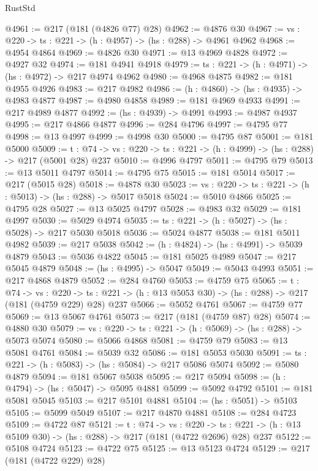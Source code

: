 \begin{lexlean}{RustStd}
\begin{coremodule}
@4961 := @217 (@181 (@4826 @77) @28)
@4962 := @4876 @30
@4967 := {vs : @220} -> {ts : @221} -> (h : @4957) -> (hs : @288) -> @4961 @4962
@4968 := @4954 @4864
@4969 := @4826 @30
@4971 := @13 @4969 @4828
@4972 := @4927 @32
@4974 := @181 @4941 @4918
@4979 := {ts : @221} -> (h : @4971) -> (hs : @4972) -> @217 @4974 @4962
@4980 := @4968 @4875
@4982 := @181 @4955 @4926
@4983 := @217 @4982
@4986 := (h : @4860) -> (hs : @4935) -> @4983 @4877
@4987 := @4980 @4858
@4989 := @181 @4969 @4933
@4991 := @217 @4989 @4877
@4992 := (hs : @4939) -> @4991
@4993 := @4987 @4937
@4995 := @217 @4866 @4877
@4996 := @284 @4796
@4997 := @4795 @77
@4998 := @13 @4997
@4999 := @4998 @30
@5000 := @4795 @87
@5001 := @181 @5000
@5009 := {t : @74} ->
  {vs : @220} -> {ts : @221} -> (h : @4999) -> (hs : @288) -> @217 (@5001 @28) @237
@5010 := @4996 @4797
@5011 := @4795 @79
@5013 := @13 @5011 @4797
@5014 := @4795 @75
@5015 := @181 @5014
@5017 := @217 (@5015 @28)
@5018 := @4878 @30
@5023 := {vs : @220} -> {ts : @221} -> (h : @5013) -> (hs : @288) -> @5017 @5018
@5024 := @5010 @4866
@5025 := @4795 @28
@5027 := @13 @5025 @4797
@5028 := @4983 @32
@5029 := @181 @4997
@5030 := @5029 @4974
@5035 := {ts : @221} -> (h : @5027) -> (hs : @5028) -> @217 @5030 @5018
@5036 := @5024 @4877
@5038 := @181 @5011 @4982
@5039 := @217 @5038
@5042 := (h : @4824) -> (hs : @4991) -> @5039 @4879
@5043 := @5036 @4822
@5045 := @181 @5025 @4989
@5047 := @217 @5045 @4879
@5048 := (hs : @4995) -> @5047
@5049 := @5043 @4993
@5051 := @217 @4868 @4879
@5052 := @284 @4760
@5053 := @4759 @75
@5065 := {t : @74} ->
  {vs : @220} ->
  {ts : @221} -> (h : @13 @5053 @30) -> (hs : @288) -> @217 (@181 (@4759 @229) @28) @237
@5066 := @5052 @4761
@5067 := @4759 @77
@5069 := @13 @5067 @4761
@5073 := @217 (@181 (@4759 @87) @28)
@5074 := @4880 @30
@5079 := {vs : @220} -> {ts : @221} -> (h : @5069) -> (hs : @288) -> @5073 @5074
@5080 := @5066 @4868
@5081 := @4759 @79
@5083 := @13 @5081 @4761
@5084 := @5039 @32
@5086 := @181 @5053 @5030
@5091 := {ts : @221} -> (h : @5083) -> (hs : @5084) -> @217 @5086 @5074
@5092 := @5080 @4879
@5094 := @181 @5067 @5038
@5095 := @217 @5094
@5098 := (h : @4794) -> (hs : @5047) -> @5095 @4881
@5099 := @5092 @4792
@5101 := @181 @5081 @5045
@5103 := @217 @5101 @4881
@5104 := (hs : @5051) -> @5103
@5105 := @5099 @5049
@5107 := @217 @4870 @4881
@5108 := @284 @4723
@5109 := @4722 @87
@5121 := {t : @74} ->
  {vs : @220} ->
  {ts : @221} -> (h : @13 @5109 @30) -> (hs : @288) -> @217 (@181 (@4722 @2696) @28) @237
@5122 := @5108 @4724
@5123 := @4722 @75
@5125 := @13 @5123 @4724
@5129 := @217 (@181 (@4722 @229) @28)

\end{coremodule}
\end{lexlean}
